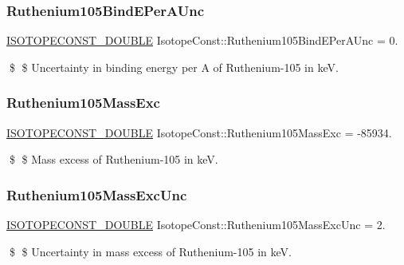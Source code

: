 \subsubsection{\texorpdfstring{Ruthenium105\+Bind\+E\+Per\+A\+Unc}{Ruthenium105BindEPerAUnc}}
{\footnotesize\ttfamily \mbox{\hyperlink{group___isotope_const-_macros_ga8f45a7272ce02c0b4c65c44636ed719a}{I\+S\+O\+T\+O\+P\+E\+C\+O\+N\+S\+T\+\_\+\+D\+O\+U\+B\+LE}} Isotope\+Const\+::\+Ruthenium105\+Bind\+E\+Per\+A\+Unc = 0.}

\$ \$ Uncertainty in binding energy per A of Ruthenium-\/105 in keV. \mbox{\label{group___isotope_const-_ruthenium-_ru105_gab8295c3a3527720838c7fdade6e2cca8}} 
\subsubsection{\texorpdfstring{Ruthenium105\+Mass\+Exc}{Ruthenium105MassExc}}
{\footnotesize\ttfamily \mbox{\hyperlink{group___isotope_const-_macros_ga8f45a7272ce02c0b4c65c44636ed719a}{I\+S\+O\+T\+O\+P\+E\+C\+O\+N\+S\+T\+\_\+\+D\+O\+U\+B\+LE}} Isotope\+Const\+::\+Ruthenium105\+Mass\+Exc = -\/85934.}

\$ \$ Mass excess of Ruthenium-\/105 in keV. \mbox{\label{group___isotope_const-_ruthenium-_ru105_ga4f657964f24b6e525ced3766580d3765}} 
\subsubsection{\texorpdfstring{Ruthenium105\+Mass\+Exc\+Unc}{Ruthenium105MassExcUnc}}
{\footnotesize\ttfamily \mbox{\hyperlink{group___isotope_const-_macros_ga8f45a7272ce02c0b4c65c44636ed719a}{I\+S\+O\+T\+O\+P\+E\+C\+O\+N\+S\+T\+\_\+\+D\+O\+U\+B\+LE}} Isotope\+Const\+::\+Ruthenium105\+Mass\+Exc\+Unc = 2.}

\$ \$ Uncertainty in mass excess of Ruthenium-\/105 in keV. \mbox{\label{group___isotope_const-_ruthenium-_ru105_gaa4eade857a7125cc7b10c8ab762bf13d}} 
